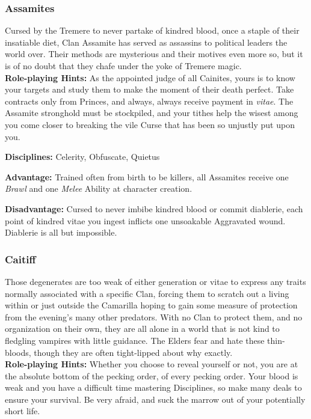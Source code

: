 \subsubsection{Assamites}
Cursed by the Tremere to never partake of kindred blood, once a staple of their 
insatiable diet, Clan Assamite has served as assassins to political leaders 
the world over.  Their methods are mysterious and their motives even more so, but 
it is of no doubt that they chafe under the yoke of Tremere magic. \\

\textbf{Role-playing Hints:}  As the appointed judge of all Cainites, yours is 
to know your targets and study them to make the moment of their death perfect.  
Take contracts only from Princes, and always, always receive payment in \emph{vitae}.  
The Assamite stronghold must be stockpiled, and your tithes help the wisest 
among you come closer to breaking the vile Curse that has been so unjustly 
put upon you.

\textbf{Disciplines:}  Celerity, Obfuscate, Quietus

\textbf{Advantage:}  Trained often from birth to be killers, all Assamites receive 
one \emph{Brawl} and one \emph{Melee} Ability at character creation.

\textbf{Disadvantage:}  Cursed to never imbibe kindred blood or commit diablerie, 
each point of kindred vitae you ingest inflicts one unsoakable Aggravated wound.  
Diablerie is all but impossible.

\subsubsection{Caitiff}
Those degenerates are too weak of either generation or vitae to express any traits 
normally associated with a specific Clan, forcing them to scratch out a living within 
or just outside the Camarilla hoping to gain some measure of protection from the evening's 
many other predators.  With no Clan to protect them, and no organization on their own, 
they are all alone in a world that is not kind to fledgling vampires with little guidance.  
The Elders fear and hate these thin-bloods, though they are often tight-lipped about why 
exactly. \\

\textbf{Role-playing Hints:}  Whether you choose to reveal yourself or not, you are 
at the absolute bottom of the pecking order, of every pecking order.  Your blood is 
weak and you have a difficult time mastering Disciplines, so make many deals to ensure 
your survival.  Be very afraid, and suck the marrow out of your potentially short life.

